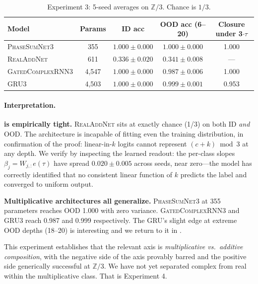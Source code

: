 \documentclass[11pt]{article}
\theoremstyle{definition}
\newcommand{\Z}{\mathbb{Z}}
\begin{document}
\begin{table}[h]
\centering
\caption{Experiment 3: 5-seed averages on $\Z/3$. Chance is $1/3$.}
\label{tab:exp3-results}
\begin{tabular}{lcccc}
\toprule
Model & Params & ID acc & OOD acc (6--20) & Closure under 3$\cdot\tau$ \\
\midrule
\textsc{PhaseSumNet3}     & 355    & $1.000 \pm 0.000$ & $\mathbf{1.000 \pm 0.000}$ & 1.000 \\
\textsc{RealAddNet}       & 611    & $\mathbf{0.336 \pm 0.020}$ & $\mathbf{0.341 \pm 0.008}$ & --- \\
\textsc{GatedComplexRNN3} & 4{,}547  & $1.000 \pm 0.000$ & $0.987 \pm 0.006$ & 1.000 \\
\textsc{GRU3}             & 4{,}503  & $1.000 \pm 0.000$ & $0.999 \pm 0.001$ & 0.953 \\
\bottomrule
\end{tabular}
\end{table}

\paragraph{Interpretation.}

\textbf{ is empirically tight.}
\textsc{RealAddNet} sits at exactly chance (1/3) on both ID
\emph{and} OOD. The architecture is incapable of fitting even the
training distribution, in confirmation of the proof: linear-in-$k$
logits cannot represent $(c+k) \bmod 3$ at any depth. We verify by
inspecting the learned readout: the per-class slopes
$\beta_j = W_{j,:} e(\tau)$ have spread $0.020 \pm 0.005$ across
seeds, near zero---the model has correctly identified that no
consistent linear function of $k$ predicts the label and converged
to uniform output.

\textbf{Multiplicative architectures all generalize.}
\textsc{PhaseSumNet3} at 355 parameters reaches OOD 1.000 with zero
variance. \textsc{GatedComplexRNN3} and \textsc{GRU3} reach 0.987
and 0.999 respectively. The GRU's slight edge at extreme OOD
depths (18--20) is interesting and we return to it in
.

This experiment establishes that the relevant axis is
\emph{multiplicative vs.\ additive composition}, with the negative
side of the axis provably barred and the positive side generically
successful at $\Z/3$. We have not yet separated complex from real
within the multiplicative class. That is Experiment 4.
\end{document}
